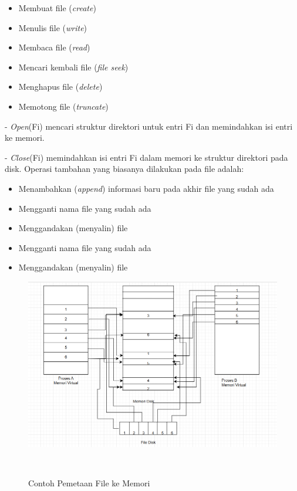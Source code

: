 \documentclass[12pt]{article}
\begin{document}
\begin{itemize}
\begin{itemize}
     		     \item Membuat file (\textit{create})  
    
     		     \item Menulis file (\textit{write})  
    
     		     \item Membaca file (\textit{read}) 
    
     		     \item Mencari kembali file (\textit{file seek}) 
    
     		     \item Menghapus file (\textit{delete}) 
    
        	     \item Memotong file (\textit{truncate}) 
             \end{itemize}
    
    
        	- \textit{Open}(Fi) mencari struktur direktori untuk entri Fi dan memindahkan isi entri ke memori. 
    
     		- \textit{Close}(Fi) memindahkan isi entri Fi dalam memori ke struktur direktori pada disk. 
     		   Operasi tambahan yang biasanya dilakukan pada file 
                  adalah: 
    
     		\begin{itemize}
     		    \item  Menambahkan (\textit{append}) informasi baru                pada akhir file yang sudah ada 
                    \item Mengganti nama file yang sudah ada 
        
         		\item Menggandakan (menyalin) file
    
     		\end{itemize} 
    
     		\begin{itemize}
     		  
                    \item Mengganti nama file yang sudah ada 
                
                    \item Menggandakan (menyalin) file
                \end{itemize}
       
                \begin{figure}[h]
                            \centering
                            \includegraphics[width=0.5\linewidth]
                            {asset/gambarfilesystem.png}
                            \caption{Contoh Pemetaan File ke Memori}
                            \label{fig:deadlock-RAG}
                            \end{figure}
       

\end{itemize}
\end{document}
